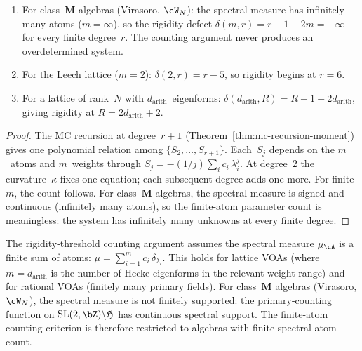\begin{proposition}%
\label{prop:rigidity-threshold}%
\ClaimStatusProvedHere%
%
\begin{enumerate}[label=\textup{(\roman*)}]
\item For class~$\mathbf{M}$ algebras
 \textup{(}Virasoro, $\cW_N$\textup{):}
 the spectral measure has infinitely many atoms
 \textup{(}$m = \infty$\textup{)}, so
 the rigidity defect $\delta(m, r) = r - 1 - 2m = -\infty$
 for every finite degree~$r$. The counting argument
 never produces an overdetermined system.
\item For the Leech lattice \textup{(}$m = 2$\textup{):}
 $\delta(2, r) = r - 5$, so rigidity begins at $r = 6$.
\item For a lattice of rank~$N$ with
 $d_{\mathrm{arith}}$~eigenforms:
 $\delta(d_{\mathrm{arith}}, R) = R - 1 - 2d_{\mathrm{arith}}$,
 giving rigidity at $R = 2d_{\mathrm{arith}} + 2$.
\end{enumerate}
\end{proposition}

\begin{proof}
The MC recursion at degree~$r{+}1$
(Theorem~\ref{thm:mc-recursion-moment}) gives one polynomial
relation among $\{S_2, \ldots, S_{r+1}\}$. Each~$S_j$
depends on the $m$~atoms and $m$~weights through
$S_j = -(1/j)\sum_i c_i\,\lambda_i^j$. At degree~$2$ the
curvature~$\kappa$ fixes one equation; each subsequent degree
adds one more. For finite~$m$, the count follows. For
class~$\mathbf{M}$ algebras, the spectral measure is
signed and continuous (infinitely many atoms), so the
finite-atom parameter count is meaningless: the system has
infinitely many unknowns at every finite degree.
\end{proof}

\begin{remark}%
\label{rem:route-c-finite-atoms}%
%
The rigidity-threshold counting argument assumes the spectral
measure $\mu_\cA$ is a finite sum of atoms:
$\mu = \sum_{i=1}^m c_i\,\delta_{\lambda_i}$. This holds
for lattice VOAs (where $m = d_{\mathrm{arith}}$ is the number
of Hecke eigenforms in the relevant weight range) and for
rational VOAs (finitely many primary fields). For
class~$\mathbf{M}$ algebras (Virasoro, $\cW_N$), the spectral
measure is not finitely supported: the primary-counting function
on $\mathrm{SL}(2,\bZ)\backslash\mathfrak{H}$ has continuous
spectral support. The finite-atom counting criterion is therefore
restricted to algebras
with finite spectral atom count.
\end{remark}

